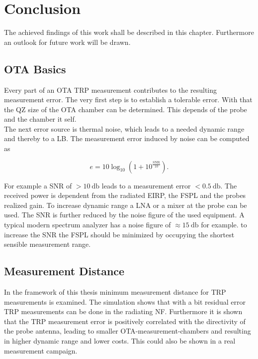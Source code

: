 \chapter{Conclusion}

The achieved findings of this work shall be described in this chapter. Furthermore an outlook for future work will be drawn.

\section{OTA Basics}

Every part of an \acf{OTA} \acf{TRP} measurement contributes to the resulting measurement error. The very first step is to establish a tolerable error. With that the \acf{QZ} size of the \ac{OTA} chamber can be determined. This depends of the probe and the chamber it self.\\
The next error source is thermal noise, which leads to a needed dynamic range and thereby to a \acf{LB}. The measurement error induced by noise can be computed as 

\begin{equation}
e = 10\log_{10}\left(1+10^{\frac{\text{SNR}}{10}}\right).
\end{equation}

For example a \acf{SNR} of $>\SI{10}{\decibel}$ leads to a measurement error $<\SI{0.5}{\decibel}$. The received power is dependent from the radiated \ac{EIRP}, the \acf{FSPL} and the probes realized gain. To increase dynamic range a \acf{LNA} or a mixer at the probe can be used. The \ac{SNR} is further reduced by the noise figure of the used equipment. A typical modern spectrum analyzer has a noise figure of $\approx\SI{15}{\decibel}$ for example. to increase the \ac{SNR} the \ac{FSPL} should be minimized by occupying the shortest sensible measurement range.

\section{Measurement Distance}

In the framework of this thesis minimum measurement distance for \acf{TRP} measurements is examined. The simulation shows that with a bit residual error \ac{TRP} measurements can be done in the radiating \acf{NF}. Furthermore it is shown that the \ac{TRP} measurement error is positively correlated with the directivity of the probe antenna, leading to smaller \ac{OTA}-measurement-chambers and resulting in higher dynamic range and lower costs. This could also be shown in a real measurement campaign.


